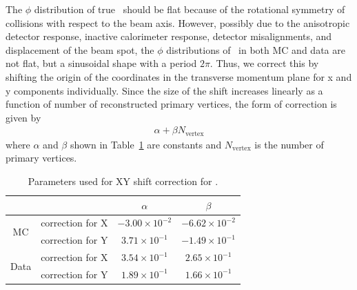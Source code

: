 The $\phi$ distribution of true \met\ should be flat because of the rotational 
symmetry of collisions with respect to the beam axis. However, possibly due to 
the anisotropic detector response, inactive calorimeter response, detector misalignments, 
and displacement of the beam spot, the $\phi$ distributions of \met\ in both 
MC and data are not flat, but a sinusoidal shape with a period $2\pi$. 
Thus, we correct this by shifting the origin of the coordinates 
in the transverse momentum plane for x and y components individually. 
Since the size of the shift increases 
linearly as a function of number of reconstructed primary vertices, 
the form of correction is given by 
\begin{eqnarray} 
\alpha + \beta N_{\textrm{vertex}}
\end{eqnarray} 
where $\alpha$ and $\beta$ shown in Table~\ref{tab:metxycorrection} are constants 
and $N_{\textrm{vertex}}$ is the number of primary vertices. 
\begin{table}[htp] 
\begin{center} 
\begin{tabular}{c||c|c|c} 
\hline 
                       &                  & $\alpha$ &  $\beta$  \\
\hline \hline 
\multirow{2}{*}{MC}    & correction for X & $-3.00 \times 10^{-2}$ & $-6.62\times 10^{-2}$  \\
                       & correction for Y & $3.71\times 10^{-1}$   & $-1.49\times 10^{-1}$  \\
\hline 
\multirow{2}{*}{Data}  & correction for X & $3.54\times 10^{-1}$   & $2.65\times 10^{-1}$   \\
                       & correction for Y & $1.89\times 10^{-1}$   & $1.66\times 10^{-1}$   \\
\hline 
\end{tabular} 
\caption{Parameters used for XY shift correction for \met.} 
\label{tab:metxycorrection} 
\end{center} 
\end{table} 

